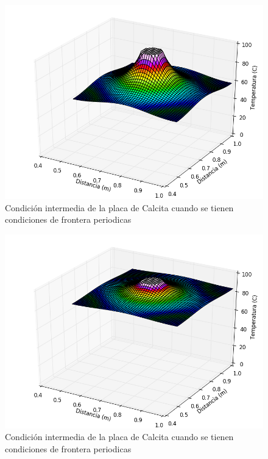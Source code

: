 \documentclass[]{article}
\begin{document}
\begin{figure}[H]
    \centering
    \includegraphics[width=\linewidth]{placaperiodicaintermedio1.png}
    \caption{Condición intermedia de la placa de Calcita cuando se tienen condiciones de frontera periodicas}
    \label{fig:placalibreintermedio1}
\end{figure}

\begin{figure}[H]
    \centering
    \includegraphics[width=\linewidth]{placaperiodicaintermedio2.png}
    \caption{Condición intermedia de la placa de Calcita cuando se tienen condiciones de frontera periodicas}
    \label{fig:placalibreintermedio2}
\end{figure}
\end{document}
